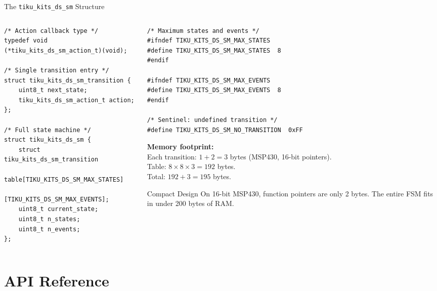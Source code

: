 \documentclass[aspectratio=169, 10pt]{beamer}
\begin{document}
\begin{frame}[fragile]{The \texttt{tiku\_kits\_ds\_sm} Structure}
\begin{columns}[T]
\begin{column}{0.48\textwidth}
\begin{lstlisting}[style=cstyle,
  title={State machine structures}]
/* Action callback type */
typedef void (*tiku_kits_ds_sm_action_t)(void);

/* Single transition entry */
struct tiku_kits_ds_sm_transition {
    uint8_t next_state;
    tiku_kits_ds_sm_action_t action;
};

/* Full state machine */
struct tiku_kits_ds_sm {
    struct tiku_kits_ds_sm_transition
        table[TIKU_KITS_DS_SM_MAX_STATES]
             [TIKU_KITS_DS_SM_MAX_EVENTS];
    uint8_t current_state;
    uint8_t n_states;
    uint8_t n_events;
};
\end{lstlisting}
\end{column}

\begin{column}{0.48\textwidth}
\begin{lstlisting}[style=cstyle,
  title={Configuration macros}]
/* Maximum states and events */
#ifndef TIKU_KITS_DS_SM_MAX_STATES
#define TIKU_KITS_DS_SM_MAX_STATES  8
#endif

#ifndef TIKU_KITS_DS_SM_MAX_EVENTS
#define TIKU_KITS_DS_SM_MAX_EVENTS  8
#endif

/* Sentinel: undefined transition */
#define TIKU_KITS_DS_SM_NO_TRANSITION  0xFF
\end{lstlisting}

\vspace{0.3em}
\textbf{Memory footprint:}\\
Each transition: $1 + 2 = 3$ bytes (MSP430, 16-bit pointers).\\
Table: $8 \times 8 \times 3 = 192$ bytes.\\
Total: $192 + 3 = 195$ bytes.

\vspace{0.3em}
\begin{block}{Compact Design}
On 16-bit MSP430, function pointers are only 2 bytes.
The entire FSM fits in under 200 bytes of RAM.
\end{block}
\end{column}
\end{columns}
\end{frame}

\section{API Reference}
\end{document}
